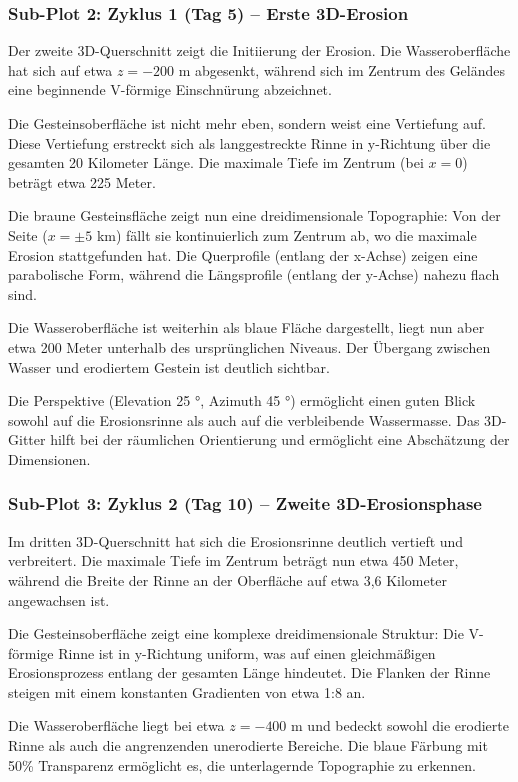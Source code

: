 \subsubsection*{Sub-Plot 2: Zyklus 1 (Tag 5) -- Erste 3D-Erosion}

Der zweite 3D-Querschnitt zeigt die Initiierung der Erosion. Die Wasseroberfläche hat sich auf etwa $z = -200$ m abgesenkt, während sich im Zentrum des Geländes eine beginnende V-förmige Einschnürung abzeichnet.

Die Gesteinsoberfläche ist nicht mehr eben, sondern weist eine Vertiefung auf. Diese Vertiefung erstreckt sich als langgestreckte Rinne in y-Richtung über die gesamten 20 Kilometer Länge. Die maximale Tiefe im Zentrum (bei $x = 0$) beträgt etwa 225 Meter.

Die braune Gesteinsfläche zeigt nun eine dreidimensionale Topographie: Von der Seite ($x = \pm 5$ km) fällt sie kontinuierlich zum Zentrum ab, wo die maximale Erosion stattgefunden hat. Die Querprofile (entlang der x-Achse) zeigen eine parabolische Form, während die Längsprofile (entlang der y-Achse) nahezu flach sind.

Die Wasseroberfläche ist weiterhin als blaue Fläche dargestellt, liegt nun aber etwa 200 Meter unterhalb des ursprünglichen Niveaus. Der Übergang zwischen Wasser und erodiertem Gestein ist deutlich sichtbar.

Die Perspektive (Elevation 25 °, Azimuth 45 °) ermöglicht einen guten Blick sowohl auf die Erosionsrinne als auch auf die verbleibende Wassermasse. Das 3D-Gitter hilft bei der räumlichen Orientierung und ermöglicht eine Abschätzung der Dimensionen.

\subsubsection*{Sub-Plot 3: Zyklus 2 (Tag 10) -- Zweite 3D-Erosionsphase}

Im dritten 3D-Querschnitt hat sich die Erosionsrinne deutlich vertieft und verbreitert. Die maximale Tiefe im Zentrum beträgt nun etwa 450 Meter, während die Breite der Rinne an der Oberfläche auf etwa 3,6 Kilometer angewachsen ist.

Die Gesteinsoberfläche zeigt eine komplexe dreidimensionale Struktur: Die V-förmige Rinne ist in y-Richtung uniform, was auf einen gleichmäßigen Erosionsprozess entlang der gesamten Länge hindeutet. Die Flanken der Rinne steigen mit einem konstanten Gradienten von etwa 1:8 an.

Die Wasseroberfläche liegt bei etwa $z = -400$ m und bedeckt sowohl die erodierte Rinne als auch die angrenzenden unerodierte Bereiche. Die blaue Färbung mit 50\% Transparenz ermöglicht es, die unterlagernde Topographie zu erkennen.

